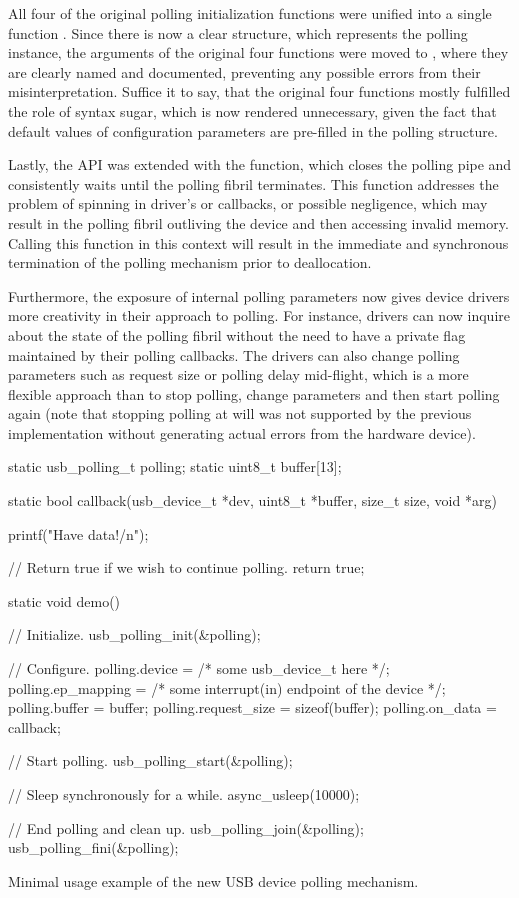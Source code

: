 All four of the original polling initialization functions were unified into a
single function . Since there is now a clear structure,
which represents the polling instance, the arguments of the original four
functions were moved to , where they are clearly named and
documented, preventing any possible errors from their misinterpretation. Suffice
it to say, that the original four functions mostly fulfilled the role of syntax
sugar, which is now rendered unnecessary, given the fact that default values of
configuration parameters are pre-filled in the polling structure.

Lastly, the API was extended with the  function, which
closes the polling pipe and consistently waits until the polling fibril
terminates. This function addresses the problem of spinning in driver's
 or  callbacks, or possible negligence,
which may result in the polling fibril outliving the device and then accessing
invalid memory. Calling this function in this context will result in the
immediate and synchronous termination of the polling mechanism prior to
deallocation.

Furthermore, the exposure of internal polling parameters now gives device
drivers more creativity in their approach to polling. For instance, drivers can
now inquire about the state of the polling fibril without the need to have a
private flag maintained by their polling callbacks. The drivers can also change
polling parameters such as request size or polling delay mid-flight, which is a
more flexible approach than to stop polling, change parameters and then start
polling again (note that stopping polling at will was not supported by the
previous implementation without generating actual errors from the hardware
device).

\begin{listing}[H]
	\begin{code}
		static usb_polling_t polling;
		static uint8_t buffer[13];

		static bool callback(usb_device_t *dev, uint8_t *buffer, size_t size, void *arg)
		{
			printf("Have data!/n");

			// Return true if we wish to continue polling.
			return true;
		}

		static void demo()
		{
			// Initialize.
			usb_polling_init(&polling);

			// Configure.
			polling.device = /* some usb_device_t here */;
			polling.ep_mapping = /* some interrupt(in) endpoint of the device */;
			polling.buffer = buffer;
			polling.request_size = sizeof(buffer);
			polling.on_data = callback;

			// Start polling.
			usb_polling_start(&polling);

			// Sleep synchronously for a while.
			async_usleep(10000);

			// End polling and clean up.
			usb_polling_join(&polling);
			usb_polling_fini(&polling);
		}
	\end{code}
	\caption{Minimal usage example of the new USB device polling mechanism.}
	\label{lst:polling-example}
\end{listing}

